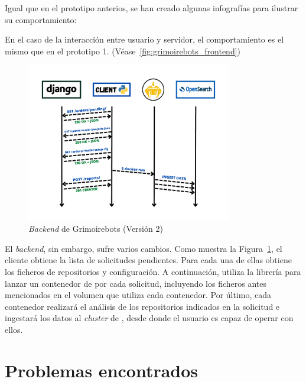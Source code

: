 Igual que en el prototipo anterios, se han creado algunas infografías para ilustrar su comportamiento:

En el caso de la interacción entre usuario y servidor, el comportamiento es el mismo que en el prototipo 1. (Véase~\ref{fig:grimoirebots_frontend})

\begin{figure}[ht]
    \centering
    \includegraphics[width=0.8\textwidth]{Figures/grimoirebots_ii_backend}
    \decoRule
    \caption[Grimoirebots II (\emph{Backend})]{\emph{Backend} de Grimoirebots (Versión 2)}
    \label{fig:grimoirebots_ii_backend}
\end{figure}

El \emph{backend}, sin embargo, sufre varios cambios. Como muestra la Figura~\ref{fig:grimoirebots_ii_backend}, el cliente obtiene la lista de solicitudes pendientes. Para cada una de ellas obtiene los ficheros de repositorios y configuración. A continuación, utiliza la librería  para lanzar un contenedor de  por cada solicitud, incluyendo los ficheros antes mencionados en el volumen que utiliza cada contenedor. Por último, cada contenedor realizará el análisis de los repositorios indicados en la solicitud e ingestará los datos al \emph{cluster} de , desde donde el usuario es capaz de operar con ellos.


\section{Problemas encontrados}

